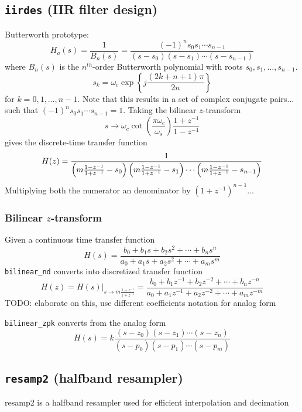 \subsection{{\tt iirdes} (IIR filter design)}
Butterworth prototype:
\[
    H_a(s) = \frac{1}{B_n(s)}
           = \frac{
                (-1)^n s_0 s_1 \cdots s_{n-1}
            }{
                (s-s_0)(s-s_1) \cdots (s-s_{n-1})
            }
\]
where $B_n(s)$ is the $n^{th}$-order Butterworth polynomial with roots
$s_0,s_1,\ldots,s_{n-1}$.
\[
    s_k = \omega_c \exp\left\{
                j \frac{\left(2k+n+1\right)\pi}{2n}
          \right\}
\]
for $k=0,1,\ldots,n-1$.
Note that this results in a set of complex conjugate pairs... such that
$(-1)^n s_0 s_1 \cdots s_{n-1} = 1$.
Taking the bilinear $z$-transform
\[
    s \rightarrow \omega_c
                  \cot\left(\frac{\pi \omega_c}{\omega_s}\right)
                  \frac{1+z^{-1}}{1-z^{-1}}
\]
gives the discrete-time transfer function
\[
    H(z) = \frac{
            1
           }{
            \left(m\frac{1-z^{-1}}{1+z^{-1}}-s_0\right)
            \left(m\frac{1-z^{-1}}{1+z^{-1}}-s_1\right)
            \cdots
            \left(m\frac{1-z^{-1}}{1+z^{-1}}-s_{n-1}\right)
           }
\]
Multiplying both the numerator an denominator by $(1+z^{-1})^{n-1}$...

\subsubsection{Bilinear $z$-transform}
Given a continuous time transfer function
\[
    H(s) = \frac{
            b_0 + b_1 s + b_2 s^2 + \cdots + b_n s^n
           }{
            a_0 + a_1 s + a_2 s^2 + \cdots + a_m s^m
           }
\]
{\tt bilinear\_nd} converts into discretized transfer function
\[
    H(z) = H(s)|_{s\rightarrow m\frac{1-z^{-1}}{1+z^{-1}}}
         = \frac{
            b_0 + b_1 z^{-1} + b_2 z^{-2} + \cdots + b_n z^{-n}
           }{
            a_0 + a_1 z^{-1} + a_2 z^{-2} + \cdots + a_m z^{-m}
           }
\]
TODO: elaborate on this, use different coefficients notation for analog form

{\tt bilinear\_zpk} converts from the analog form
\[
    H(s) = k \frac{
            (s-z_0)(s-z_1)\cdots(s-z_n)
           }{
            (s-p_0)(s-p_1)\cdots(s-p_m)
           }
\]

\subsection{{\tt resamp2} (halfband resampler)}
resamp2 is a halfband resampler used for efficient interpolation and
decimation

